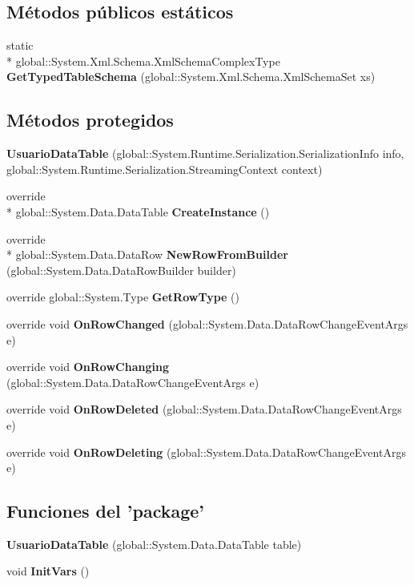 \subsection*{Métodos públicos estáticos}
\begin{DoxyCompactItemize}
\item 
static \\*
global\-::\-System.\-Xml.\-Schema.\-Xml\-Schema\-Complex\-Type {\bf Get\-Typed\-Table\-Schema} (global\-::\-System.\-Xml.\-Schema.\-Xml\-Schema\-Set xs)
\end{DoxyCompactItemize}
\subsection*{Métodos protegidos}
\begin{DoxyCompactItemize}
\item 
{\bf Usuario\-Data\-Table} (global\-::\-System.\-Runtime.\-Serialization.\-Serialization\-Info info, global\-::\-System.\-Runtime.\-Serialization.\-Streaming\-Context context)
\item 
override \\*
global\-::\-System.\-Data.\-Data\-Table {\bf Create\-Instance} ()
\item 
override \\*
global\-::\-System.\-Data.\-Data\-Row {\bf New\-Row\-From\-Builder} (global\-::\-System.\-Data.\-Data\-Row\-Builder builder)
\item 
override global\-::\-System.\-Type {\bf Get\-Row\-Type} ()
\item 
override void {\bf On\-Row\-Changed} (global\-::\-System.\-Data.\-Data\-Row\-Change\-Event\-Args e)
\item 
override void {\bf On\-Row\-Changing} (global\-::\-System.\-Data.\-Data\-Row\-Change\-Event\-Args e)
\item 
override void {\bf On\-Row\-Deleted} (global\-::\-System.\-Data.\-Data\-Row\-Change\-Event\-Args e)
\item 
override void {\bf On\-Row\-Deleting} (global\-::\-System.\-Data.\-Data\-Row\-Change\-Event\-Args e)
\end{DoxyCompactItemize}
\subsection*{Funciones del 'package'}
\begin{DoxyCompactItemize}
\item 
{\bf Usuario\-Data\-Table} (global\-::\-System.\-Data.\-Data\-Table table)
\item 
void {\bf Init\-Vars} ()
\end{DoxyCompactItemize}
